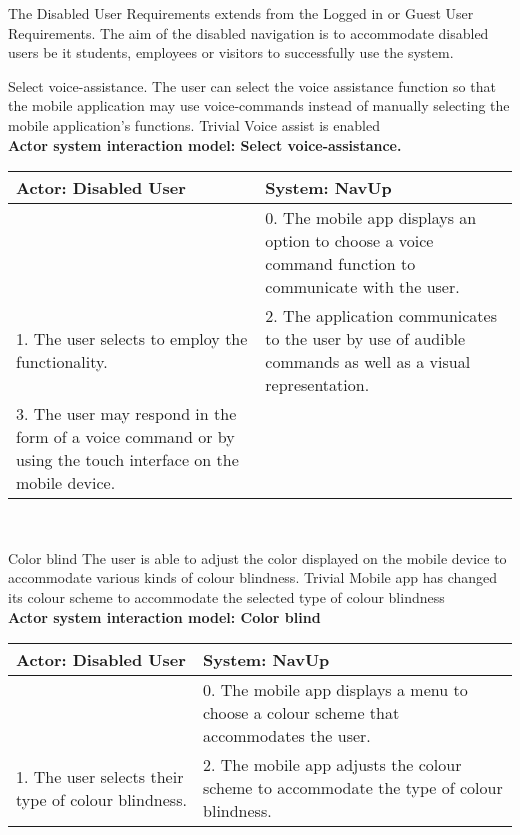 The Disabled User Requirements extends from the Logged in or Guest User Requirements. The aim of the disabled navigation is to accommodate disabled users be it students, employees or visitors to successfully use the system.

\FuncReq
{Select voice-assistance.}
{The user can select the voice assistance function so that the mobile application may use voice-commands instead of manually selecting the mobile application's functions.}
{Trivial}
{Voice assist is enabled}
    \\
    \textbf{Actor system interaction model: Select voice-assistance.}\\
    \begin{tabular}{ | p{6cm} | p{6cm} |}
    \hline
    Actor: Disabled User & System: NavUp \\ \hline
     & 0. The mobile app displays an option to choose a voice command function to communicate with the user.\\ \hline
    1. The user selects to employ the functionality. & 2. The application communicates to the user by use of audible commands as well as a visual representation.\\ \hline
    3. The user may respond in the form of a voice command or by using the touch interface on the mobile device. & \\ \hline
    
    \end{tabular}
\\
\bigskip

\FuncReq
{Color blind}
{The user is able to adjust the color displayed on the mobile device to accommodate various kinds of colour blindness.}
{Trivial}
{Mobile app has changed its colour scheme to accommodate the selected type of colour blindness}
    \\
    \textbf{Actor system interaction model: Color blind}\\
    \begin{tabular}{ | p{6cm} | p{6cm} |}
    \hline
    Actor: Disabled User & System: NavUp \\ \hline
     & 0. The mobile app displays a menu to choose a colour scheme that accommodates the user.\\ \hline
    1. The user selects their type of colour blindness. & 2. The mobile app adjusts the colour scheme to accommodate the type of colour blindness.\\ \hline   
    \end{tabular}
\\
\bigskip

